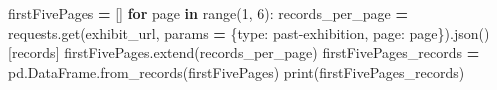 \documentclass[
]{book}
\newenvironment{Shaded}{\begin{snugshade}}{\end{snugshade}}
\newcommand{\BuiltInTok}[1]{#1}
\newcommand{\ControlFlowTok}[1]{\textcolor[rgb]{0.13,0.29,0.53}{\textbf{#1}}}
\newcommand{\DecValTok}[1]{\textcolor[rgb]{0.00,0.00,0.81}{#1}}
\newcommand{\KeywordTok}[1]{\textcolor[rgb]{0.13,0.29,0.53}{\textbf{#1}}}
\newcommand{\NormalTok}[1]{#1}
\newcommand{\OperatorTok}[1]{\textcolor[rgb]{0.81,0.36,0.00}{\textbf{#1}}}
\newcommand{\StringTok}[1]{\textcolor[rgb]{0.31,0.60,0.02}{#1}}
\begin{document}
\begin{alert}
\begin{Shaded}
\begin{Highlighting}[]
\NormalTok{firstFivePages }\OperatorTok{=}\NormalTok{ []}
\ControlFlowTok{for}\NormalTok{ page }\KeywordTok{in} \BuiltInTok{range}\NormalTok{(}\DecValTok{1}\NormalTok{, }\DecValTok{6}\NormalTok{):}
\NormalTok{    records\_per\_page }\OperatorTok{=}\NormalTok{ requests.get(exhibit\_url, params }\OperatorTok{=}\NormalTok{ \{}\StringTok{\textquotesingle{}type\textquotesingle{}}\NormalTok{: }\StringTok{\textquotesingle{}past{-}exhibition\textquotesingle{}}\NormalTok{, }\StringTok{\textquotesingle{}page\textquotesingle{}}\NormalTok{: page\}).json()[}\StringTok{\textquotesingle{}records\textquotesingle{}}\NormalTok{]}
\NormalTok{    firstFivePages.extend(records\_per\_page)}
\NormalTok{firstFivePages\_records }\OperatorTok{=}\NormalTok{ pd.DataFrame.from\_records(firstFivePages)}
\BuiltInTok{print}\NormalTok{(firstFivePages\_records)}
\end{Highlighting}
\end{Shaded}


\end{alert}
\end{document}
